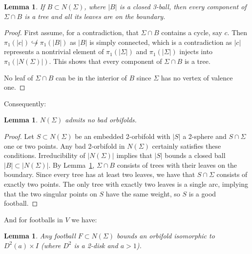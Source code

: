 \documentclass[12pt,reqno]{amsart}
\theoremstyle{plain}
\theoremstyle{definition}
\numberwithin{subcase}{case}
\theoremstyle{plain}
\newtheorem{lemm}[thm]{Lemma}
\theoremstyle{definition}
\begin{document}
\begin{lemm}
If $B \subset N(\Sigma)$, where $|B|$ is a closed 3-ball, then every component of  $\Sigma\cap B$ is a tree and all its leaves are on the boundary.
\label{leavesonboundary}
\end{lemm}

\begin{proof}
First assume, for a contradiction, that $\Sigma\cap B$ contains a cycle, say \(c\).  Then $\pi_1(|c|)\not\hookrightarrow \pi_1(|B|)$ as $|B|$ is simply connected, which is a contradiction as \(|c|\) represents a nontrivial element of \(\pi_{1}(|\Sigma|)\) and $\pi_1(|\Sigma|)$ injects into $\pi_1(|N(\Sigma)|)$.  This shows that every component of $\Sigma\cap B$ is a tree. 

No leaf of $\Sigma\cap B$ can be in the interior of \(B\) since \(\Sigma\) has no vertex of valence one.
\end{proof}

Consequently:

\begin{lemm}
\(N(\Sigma)\) admits no bad orbifolds.
\label{Lem:NoBadOrbsInNS}
\end{lemm}

\begin{proof}
Let \(S \subset N(\Sigma)\) be an embedded 2-orbifold with \(|S|\) a 2-sphere and \(S \cap \Sigma\) one or two points.  Any bad 2-orbifold in \(N(\Sigma)\) certainly satisfies these conditions.  Irreducibility of \(|N(\Sigma)|\) implies that \(|S|\) bounds a closed ball \(|B| \subset |N(\Sigma)|\).  By Lemma~\ref{leavesonboundary}, \(\Sigma \cap B\) consists of trees with their leaves on the boundary.  Since every tree has at least two leaves, we have that  \(S \cap \Sigma\) consists of exactly two points.  The only tree with exactly two leaves is a single arc, implying that the two singular points on \(S\) have the same weight, so \(S\) is a good football.
\end{proof}

And for footballs in \(V\) we have:

\begin{lemm}
Any football \(F \subset N(\Sigma)\) bounds an orbifold isomorphic to \(D^{2}(a) \times I\) (where \(D^{2}\) is a 2-disk and \(a>1\)).
\label{Lem:GoodFootballsInNS}
\end{lemm}
\end{document}
